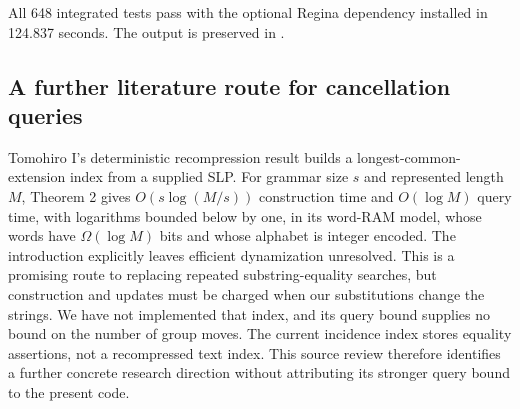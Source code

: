 All 648 integrated tests pass with the optional Regina dependency installed
in 124.837 seconds. The output is preserved in
.

\subsection{A further literature route for cancellation queries}

Tomohiro I's deterministic recompression result \cite{i-recompression-lce}
builds a longest-common-extension index from a supplied SLP. For grammar
size $s$ and represented length $M$, Theorem 2 gives
$O(s\log(M/s))$ construction time and $O(\log M)$ query time, with
logarithms bounded below by one, in its
word-RAM model, whose words have $\Omega(\log M)$ bits and whose alphabet
is integer encoded. The introduction explicitly leaves efficient
dynamization unresolved. This is a promising route to replacing repeated
substring-equality searches, but construction and updates must be charged
when our substitutions change the strings. We have not implemented that
index, and its query bound supplies no bound on the number of group moves.
The current incidence index stores equality assertions, not a recompressed
text index. This source review therefore identifies a further concrete
research direction without attributing its stronger query bound to the
present code.
